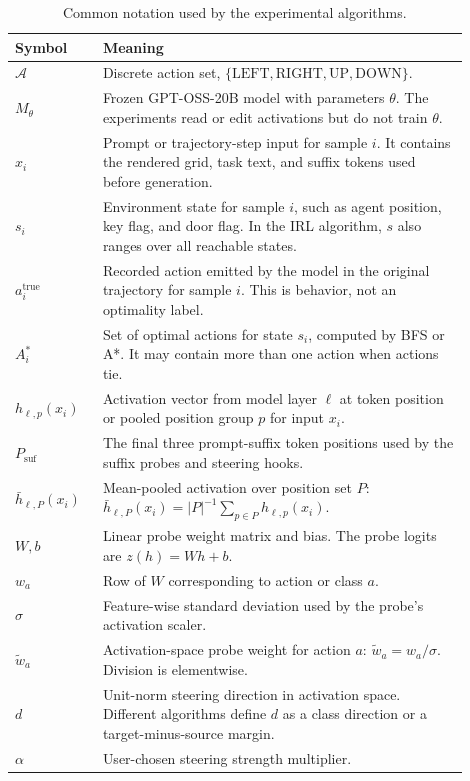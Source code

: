 \documentclass[11pt]{article}
\begin{document}
\begin{table}[t]
\centering
\small
\caption{Common notation used by the experimental algorithms.}
\label{tab:notation}
\begin{tabular}{p{0.17\linewidth} p{0.73\linewidth}}
\toprule
Symbol & Meaning \\
\midrule
$\mathcal{A}$ & Discrete action set, $\{\mathrm{LEFT},\mathrm{RIGHT},\mathrm{UP},\mathrm{DOWN}\}$. \\
$M_\theta$ & Frozen GPT-OSS-20B model with parameters $\theta$. The experiments read or edit activations but do not train $\theta$. \\
$x_i$ & Prompt or trajectory-step input for sample $i$. It contains the rendered grid, task text, and suffix tokens used before generation. \\
$s_i$ & Environment state for sample $i$, such as agent position, key flag, and door flag. In the IRL algorithm, $s$ also ranges over all reachable states. \\
$a_i^{\mathrm{true}}$ & Recorded action emitted by the model in the original trajectory for sample $i$. This is behavior, not an optimality label. \\
$A_i^*$ & Set of optimal actions for state $s_i$, computed by BFS or A*. It may contain more than one action when actions tie. \\
$h_{\ell,p}(x_i)$ & Activation vector from model layer $\ell$ at token position or pooled position group $p$ for input $x_i$. \\
$P_{\mathrm{suf}}$ & The final three prompt-suffix token positions used by the suffix probes and steering hooks. \\
$\bar{h}_{\ell,P}(x_i)$ & Mean-pooled activation over position set $P$: $\bar{h}_{\ell,P}(x_i)=|P|^{-1}\sum_{p\in P}h_{\ell,p}(x_i)$. \\
$W,b$ & Linear probe weight matrix and bias. The probe logits are $z(h)=Wh+b$. \\
$w_a$ & Row of $W$ corresponding to action or class $a$. \\
$\sigma$ & Feature-wise standard deviation used by the probe's activation scaler. \\
$\tilde{w}_a$ & Activation-space probe weight for action $a$: $\tilde{w}_a=w_a/\sigma$. Division is elementwise. \\
$d$ & Unit-norm steering direction in activation space. Different algorithms define $d$ as a class direction or a target-minus-source margin. \\
$\alpha$ & User-chosen steering strength multiplier. \\

\end{tabular}
\end{table}
\end{document}
